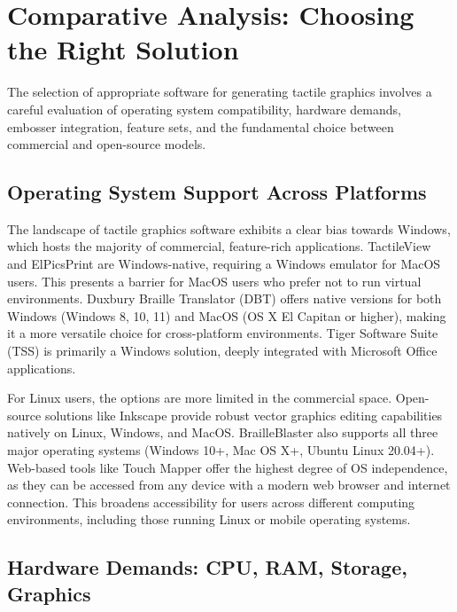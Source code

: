 \section{Comparative Analysis: Choosing the Right Solution}\label{sec:comparative-analysis}

The selection of appropriate software for generating tactile graphics involves a careful evaluation of operating system compatibility, hardware demands, embosser integration, feature sets, and the fundamental choice between commercial and open-source models.

\subsection{Operating System Support Across Platforms}

The landscape of tactile graphics software exhibits a clear bias towards Windows, which hosts the majority of commercial, feature-rich applications. TactileView and ElPicsPrint are Windows-native, requiring a Windows emulator for MacOS users.\cite{DuxburyDetails,BlindSVG,DuxburyNews} This presents a barrier for MacOS users who prefer not to run virtual environments. Duxbury Braille Translator (DBT) offers native versions for both Windows (Windows 8, 10, 11) and MacOS (OS X El Capitan or higher), making it a more versatile choice for cross-platform environments. Tiger Software Suite (TSS) is primarily a Windows solution, deeply integrated with Microsoft Office applications.\cite{EmeraldCoast,ElitaManual}



For Linux users, the options are more limited in the commercial space. Open-source solutions like Inkscape provide robust vector graphics editing capabilities natively on Linux, Windows, and MacOS.\cite{BlindHelpDBT} BrailleBlaster also supports all three major operating systems (Windows 10+, Mac OS X+, Ubuntu Linux 20.04+).\cite{SterlingAdaptivesVP} Web-based tools like Touch Mapper offer the highest degree of OS independence, as they can be accessed from any device with a modern web browser and internet connection.\cite{AELData,NYUWorkflow,Ability2AccessTSS} This broadens accessibility for users across different computing environments, including those running Linux or mobile operating systems.

\subsection{Hardware Demands: CPU, RAM, Storage, Graphics}

